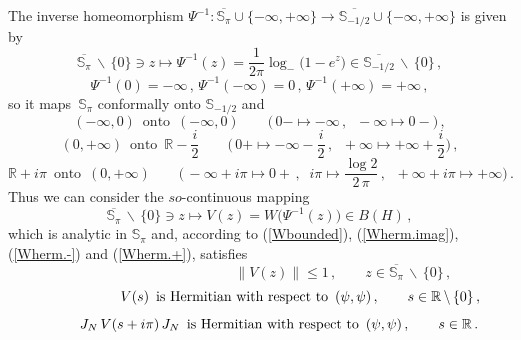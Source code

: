 \documentclass[reqno]{amsart}
\theoremstyle{definition}
\theoremstyle{remark}
\numberwithin{equation}{section}
\theoremstyle{plain}
\begin{document}
The inverse homeomorphism $\Psi^{-1} : \overline{\mathbb S_\pi}
\cup\{-\infty ,+\infty\}\longrightarrow\overline{\mathbb S_{-1/2}}
\cup\{-\infty ,+\infty\}$ is given by
\begin{equation*}
\overline{\mathbb S_\pi}\,\backslash\,\{ 0\}\ni z\longmapsto
\Psi^{-1} (z)=\frac 1{2 \pi} \log_-\big( 1-e^z\big)\in
\overline{\mathbb S_{-1/2}}\,\backslash\,\{ 0\}\, ,
\end{equation*}
\begin{equation*}
\Psi^{-1} (0)=-\infty\, ,\,\Psi^{-1} (-\infty )=0\, ,\,\Psi^{-1}
(+\infty )=+\infty\, ,
\end{equation*}
so it maps $\,\mathbb S_\pi$ conformally onto $\mathbb S_{-1/2}$
and
\begin{equation*}
(-\infty ,0)\,\text{ onto }\, (-\infty ,0)\qquad \Big(\,
0{\scriptscriptstyle -}\mapsto -\infty\, ,\;\;
-\infty\mapsto 0{\scriptscriptstyle -}\Big)\, ,
\end{equation*}
\begin{equation*}
(0,+\infty )\,\text{ onto }\,\mathbb R -\frac i2\qquad \Big(\,
0{\scriptscriptstyle +}\mapsto -\infty -\frac i2\, ,\;\;
+\infty\mapsto +\infty +\frac i2\Big)\, ,
\end{equation*}
\begin{equation*}
\mathbb R +i \pi\,\text{ onto }\, (0,+\infty )\qquad \Big(\,
-\infty +i \pi\mapsto 0{\scriptscriptstyle +}\, ,\;\;
i \pi\mapsto \frac{\log 2}{2\,\pi}\, ,\;\;
+\infty +i \pi\mapsto +\infty\Big)\, .
\end{equation*}
Thus we can consider the $so$-continuous mapping
\begin{equation}\label{map}
\overline{\mathbb S_\pi}\,\backslash\,\{ 0\}\ni z\longmapsto
V(z)=W\big( \Psi^{-1}(z)\big)\in B(H)\, ,
\end{equation}
which is analytic in $\mathbb S_\pi$ and, according to
(\ref{Wbounded}), (\ref{Wherm.imag}), (\ref{Wherm.-}) and
(\ref{Wherm.+}), satisfies
\begin{equation}\label{Vbounded} \hspace{5cm}
\| V(z)\|\leq 1\, ,\qquad z\in\overline{\mathbb S_\pi}\,
\backslash\,\{ 0\}\, ,
\end{equation}
\begin{equation}\label{Vherm.} \hspace{2.05cm}
V(s)\,\text{ is Hermitian with respect to }\, (\psi ,\psi )\, ,
\qquad s\in\mathbb R\,\backslash\,\{ 0\}\, ,
\end{equation}
\begin{equation}\label{Vherm.imag} \hspace{0.97cm}
J_N\, V(s+i\pi )\, J_N\,\text{ is Hermitian with respect to }\,
(\psi ,\psi )\, ,\qquad s\in\mathbb R\, .
\end{equation}
\smallskip
\end{document}
